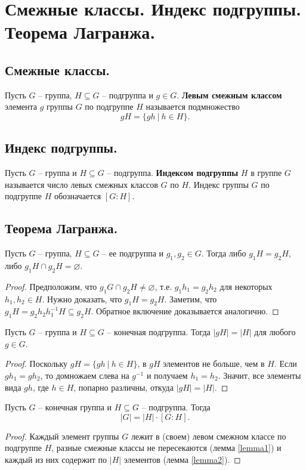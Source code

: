 \section{Смежные классы. Индекс подгруппы. Теорема Лагранжа.}

\subsection{Смежные классы.}
\begin{definition}
    Пусть $G$ -- группа, $H \subseteq G$ -- подгруппа и $g \in G$. \textbf{Левым смежным классом} элемента $g$ группы $G$ по подгруппе $H$ называется подмножество
    \[
        gH = \{gh \> | \> h \in H \}.
    \]
\end{definition}

\subsection{Индекс подгруппы.}
\begin{definition}
    Пусть $G$ -- группа и $H \subseteq G$ -- подгруппа. \textbf{Индексом подгруппы} $H$ в группе $G$ называется число левых смежных классов $G$ по $H$.
    Индекс группы $G$ по подгруппе $H$ обозначается $[G : H]$.
\end{definition}

\subsection{Теорема Лагранжа.}
\begin{lemma} \label{lemma1}
    Пусть $G$ -- группа, $H \subseteq G$ -- ее подгруппа и $g_1, g_2 \in G$. Тогда либо $g_1H = g_2H$, либо $g_1H \cap g_2H = \varnothing$.
    \begin{proof}
        Предположим, что $g_1G \cap g_2H \neq \varnothing$, т.е. $g_1h_1 = g_2h_2$ для некоторых $h_1, h_2 \in H$. Нужно доказать, что $g_1H = g_2H$. Заметим, что $g_1H = g_2h_2h_1^{-1}H \subseteq g_2H$. Обратное включение доказывается аналогично.
    \end{proof}
\end{lemma}
\begin{lemma} \label{lemma2}
    Пусть $G$ -- группа и $H \subseteq G$ -- конечная подгруппа. Тогда $|gH| = |H|$ для любого $g \in G$.
    \begin{proof}
        Поскольку $gH = \{gh \> | \>  h \in H\}$, в $gH$ элементов не больше, чем в $H$. Если $gh_1 = gh_2$, то домножаем слева на $g^{-1}$ и получаем $h_1 = h_2$. Значит, все элементы вида $gh$, где $h \in H$, попарно различны, откуда $|gH| = |H|$.
    \end{proof}
\end{lemma}
\begin{theorem}
    Пусть $G$ -- конечная группа и $H \subseteq G$ -- подгруппа. Тогда
    \[
        |G| = |H| \cdot [G : H].
    \]
    \begin{proof}
        Каждый элемент группы $G$ лежит в (своем) левом смежном классе по подгруппе $H$, разные смежные классы не пересекаются (лемма \ref{lemma1}) и каждый из них содержит по $|H|$ элементов (лемма \ref{lemma2}).
    \end{proof}
\end{theorem}